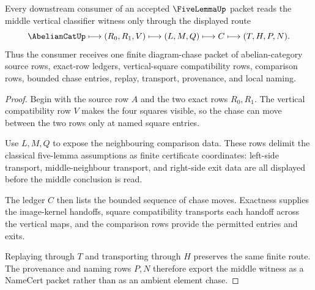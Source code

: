 \begin{theorem}
\label{thm:five-lemma-finite-diagram-chase}
Every downstream consumer of an accepted $\FiveLemmaUp$ packet reads the middle
vertical classifier witness only through the displayed route
$$
\AbelianCatUp \longmapsto (R_0,R_1,V)
\longmapsto (L,M,Q) \longmapsto C \longmapsto (T,H,P,N).
$$
Thus the consumer receives one finite diagram-chase packet of abelian-category
source rows, exact-row ledgers, vertical-square compatibility rows, comparison
rows, bounded chase entries, replay, transport, provenance, and local naming.
\end{theorem}
\begin{proof}
Begin with the source row $A$ and the two exact rows $R_0,R_1$. The vertical
compatibility row $V$ makes the four squares visible, so the chase can move
between the two rows only at named square entries.

Use $L,M,Q$ to expose the neighbouring comparison data. These rows delimit the
classical five-lemma assumptions as finite certificate coordinates: left-side
transport, middle-neighbour transport, and right-side exit data are all
displayed before the middle conclusion is read.

The ledger $C$ then lists the bounded sequence of chase moves. Exactness supplies
the image-kernel handoffs, square compatibility transports each handoff across
the vertical maps, and the comparison rows provide the permitted entries and
exits.

Replaying through $T$ and transporting through $H$ preserves the same finite
route. The provenance and naming rows $P,N$ therefore export the middle witness
as a NameCert packet rather than as an ambient element chase.
\end{proof}


\begin{closurestatus}{\FiveLemmaUp}
  \theoryclosure{\seedClosure}
  \formalstatus{\unformalizedV}
\end{closurestatus}
